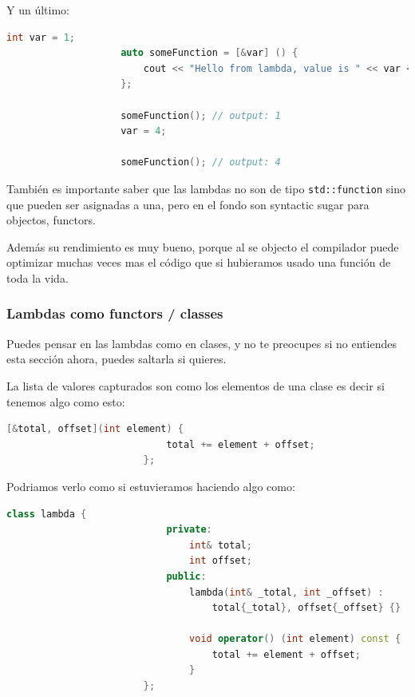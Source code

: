 \documentclass[12pt, fleqn]{report}                             %
\theoremstyle{break}                                            %
\newcommand{\textCode}[1]  { \texttt{#1} }                      %
\begin{document}
                Y un último:
                \begin{lstlisting}[language=C++, gobble=20]
                    int var = 1;
                    auto someFunction = [&var] () { 
                        cout << "Hello from lambda, value is " << var << endl;
                    };

                    someFunction(); // output: 1
                    var = 4;

                    someFunction(); // output: 4
                \end{lstlisting}

                También es importante saber que las lambdas no son de tipo \textCode{std::function}
                sino que pueden ser asignadas a una, pero en el fondo son syntactic sugar para objectos,
                functors.

                Además su rendimiento es muy bueno, porque al se objecto el compilador puede optimizar
                muchas veces mas el código que si hubieramos usado una función de toda la vida.


                \clearpage
                \subsubsection{Lambdas como functors / classes}
                
                    Puedes pensar en las lambdas como en clases, y no te preocupes si no entiendes
                    esta sección ahora, puedes saltarla si quieres.

                    La lista de valores capturados son como los elementos de una clase
                    es decir si tenemos algo como esto:

                    \begin{lstlisting}[language=C++, gobble=24]
                        [&total, offset](int element) { 
                            total += element + offset;
                        };
                    \end{lstlisting}

                    Podriamos verlo como si estuvieramos haciendo algo como:
                    \begin{lstlisting}[language=C++, gobble=24]
                        class lambda {
                            private:
                                int& total;
                                int offset;
                            public: 
                                lambda(int& _total, int _offset) : 
                                    total{_total}, offset{_offset} {}

                                void operator() (int element) const { 
                                    total += element + offset;
                                }
                        };
                    \end{lstlisting}
\end{document}
